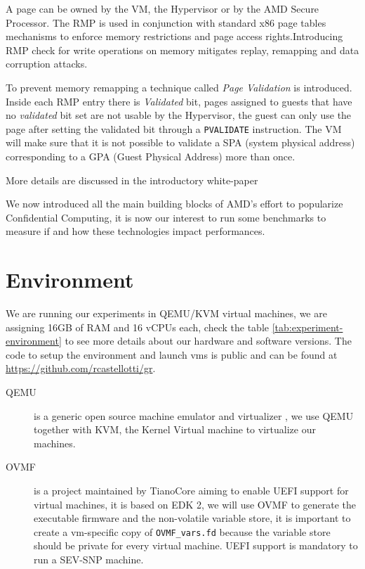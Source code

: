 \documentclass[twocolumn]{article}
\begin{document}
A page can be owned by the VM, the Hypervisor or by the AMD Secure Processor. The RMP is used in conjunction with standard x86 page tables mechanisms to enforce memory restrictions and page access rights.Introducing RMP check for write operations on memory mitigates replay, remapping and data corruption attacks. 

To prevent memory remapping a technique called \textit{Page Validation} is introduced. Inside each RMP entry there is \textit{Validated} bit, pages assigned to guests that have no \textit{validated} bit set are not usable by the Hypervisor, the guest can only use the page after setting the validated bit through a \texttt{PVALIDATE} instruction. The VM will make sure that it is not possible to validate a SPA (system physical address) corresponding to a GPA (Guest Physical Address) more than once.
 
More details are discussed in the introductory white-paper \cite{sev-snp}

We now introduced all the main building blocks of AMD's effort to popularize Confidential Computing, it is now our interest to run some benchmarks to measure if and how these technologies impact performances.

\section{Environment}
\label{sec:environment}
    
We are running our experiments in QEMU/KVM virtual machines, we are assigning 16GB of RAM and 16 vCPUs each, check the table \ref{tab:experiment-environment} to see more details about our hardware and software versions. The code to setup the environment and launch vms is public and can be found at \href{https://github.com/rcastellotti/gr}{https://github.com/rcastellotti/gr}.

\begin{description}
    \item[QEMU] is a generic open source machine emulator and virtualizer \cite{qemu}, we use QEMU together with KVM, the Kernel Virtual machine to virtualize our machines.
    \item[OVMF] is a project maintained by TianoCore \cite{ovmf} aiming to enable UEFI support for virtual machines, it is based on EDK 2, we will use OVMF to generate the executable firmware and the non-volatile variable store, it is important to create a vm-specific copy of \texttt{OVMF\_vars.fd} because the variable store should be private for every virtual machine. UEFI support is mandatory to run a SEV-SNP machine.
\end{description}
\end{document}
